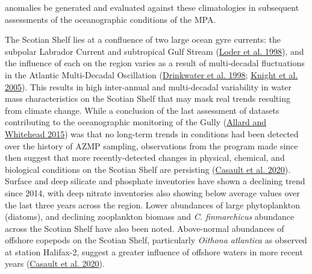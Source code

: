 \documentclass[12pt]{article}\usepackage[]{graphicx}\usepackage[]{color}
\begin{document}
anomalies be generated and evaluated against these climatologies in subsequent assessments of the oceanographic conditions of the MPA.

The Scotian Shelf lies at a confluence of two large ocean gyre currents: the subpolar Labrador Current and subtropical Gulf Stream (\protect\hyperlink{ref-loder_1998}{Loder et al. 1998}), and the influence of each on the region varies as a result of multi-decadal fluctuations in the Atlantic Multi-Decadal Oscillation (\protect\hyperlink{ref-drinkwater_1998}{Drinkwater et al. 1998}; \protect\hyperlink{ref-knight_2005}{Knight et al. 2005}). This results in high inter-annual and multi-decadal variability in water mass characteristics on the Scotian Shelf that may mask real trends resulting from climate change. While a conclusion of the last assessment of datasets contributing to the oceanographic monitoring of the Gully (\protect\hyperlink{ref-allard_2015}{Allard and Whitehead 2015}) was that no long-term trends in conditions had been detected over the history of AZMP sampling, observations from the program made since then suggest that more recently-detected changes in physical, chemical, and biological conditions on the Scotian Shelf are persisting (\protect\hyperlink{ref-casault_2020}{Casault et al. 2020}). Surface and deep silicate and phosphate inventories have shown a declining trend since 2014, with deep nitrate inventories also showing below average values over the last three years across the region. Lower abundances of large phytoplankton (diatoms), and declining zooplankton biomass and \emph{C. finmarchicus} abundance across the Scotian Shelf have also been noted. Above-normal abundances of offshore copepods on the Scotian Shelf, particularly \emph{Oithona atlantica} as observed at station Halifax-2, suggest a greater influence of offshore waters in more recent years (\protect\hyperlink{ref-casault_2020}{Casault et al. 2020}).
\end{document}
